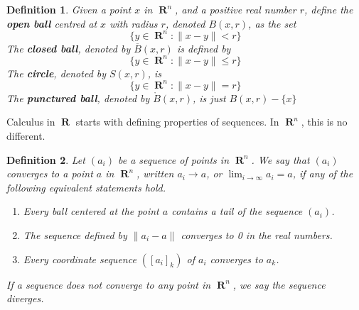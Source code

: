\documentclass{report}
\newtheorem{definition}{Definition}
\DeclareMathOperator{\real}{\mathbf{R}}
\begin{document}
\begin{definition}
  Given a point $x$ in $\real^n$, and a positive real number $r$, define the {\bf open ball} centred at $x$ with radius $r$, denoted $B(x,r)$, as the set
  \[ \{ y \in \real^n : \| x - y \| < r \} \]
  The {\bf closed ball}, denoted by $\overline{B}(x,r)$ is defined by
  \[ \{ y \in \real^n : \| x - y \| \leq r \} \]
  The {\bf circle}, denoted by $S(x,r)$, is
  \[ \{ y \in \real^n : \| x - y \| = r \} \]
  The {\bf punctured ball}, denoted by $\mathring{B}(x,r)$, is just $B(x,r) - \{x\}$
\end{definition}

Calculus in $\real$ starts with defining properties of sequences. In $\real^n$, this is no different.

\begin{definition}
  Let $(a_i)$ be a sequence of points in $\real^n$. We say that $(a_i)$ converges to a point $a$ in $\real^n$, written $a_i \to a$, or $\lim_{i \to \infty} a_i = a$, if any of the following equivalent statements hold.
  \begin{enumerate}
    \item Every ball centered at the point $a$ contains a tail of the sequence $(a_i)$.
    \item The sequence defined by $\| a_i - a \|$ converges to 0 in the real numbers.
    \item Every coordinate sequence $([a_i]_k)$ of $a_i$ converges to $a_k$.
  \end{enumerate}
  If a sequence does not converge to any point in $\real^n$, we say the sequence diverges.
\end{definition}
\end{document}
